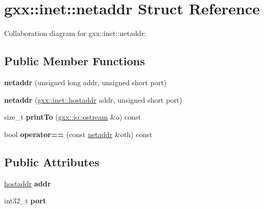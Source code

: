 \hypertarget{structgxx_1_1inet_1_1netaddr}{}\section{gxx\+:\+:inet\+:\+:netaddr Struct Reference}
\label{structgxx_1_1inet_1_1netaddr}


Collaboration diagram for gxx\+:\+:inet\+:\+:netaddr\+:
\subsection*{Public Member Functions}
\begin{DoxyCompactItemize}
\item 
{\bfseries netaddr} (unsigned long addr, unsigned short port)\hypertarget{structgxx_1_1inet_1_1netaddr_a7db37d2c311d45f1f4867569eb7c07c7}{}\label{structgxx_1_1inet_1_1netaddr_a7db37d2c311d45f1f4867569eb7c07c7}

\item 
{\bfseries netaddr} (\hyperlink{classgxx_1_1hostaddr}{gxx\+::inet\+::hostaddr} addr, unsigned short port)\hypertarget{structgxx_1_1inet_1_1netaddr_a3afc7a4e5424e16fbf3e73d87849d2a2}{}\label{structgxx_1_1inet_1_1netaddr_a3afc7a4e5424e16fbf3e73d87849d2a2}

\item 
size\+\_\+t {\bfseries print\+To} (\hyperlink{classgxx_1_1io_1_1ostream}{gxx\+::io\+::ostream} \&o) const \hypertarget{structgxx_1_1inet_1_1netaddr_af139de45b090b16543e8a50dcc8b445d}{}\label{structgxx_1_1inet_1_1netaddr_af139de45b090b16543e8a50dcc8b445d}

\item 
bool {\bfseries operator==} (const \hyperlink{structgxx_1_1inet_1_1netaddr}{netaddr} \&oth) const \hypertarget{structgxx_1_1inet_1_1netaddr_a2e83050ccb159ec57c4f5716a026a2be}{}\label{structgxx_1_1inet_1_1netaddr_a2e83050ccb159ec57c4f5716a026a2be}

\end{DoxyCompactItemize}
\subsection*{Public Attributes}
\begin{DoxyCompactItemize}
\item 
\hyperlink{classgxx_1_1hostaddr}{hostaddr} {\bfseries addr}\hypertarget{structgxx_1_1inet_1_1netaddr_a3d8b2d4701cc6e5942eaaa1054b52db4}{}\label{structgxx_1_1inet_1_1netaddr_a3d8b2d4701cc6e5942eaaa1054b52db4}

\item 
int32\+\_\+t {\bfseries port}\hypertarget{structgxx_1_1inet_1_1netaddr_a8fc1aad61061f4bbb4ef8dea77b7d9f9}{}\label{structgxx_1_1inet_1_1netaddr_a8fc1aad61061f4bbb4ef8dea77b7d9f9}

\end{DoxyCompactItemize}


